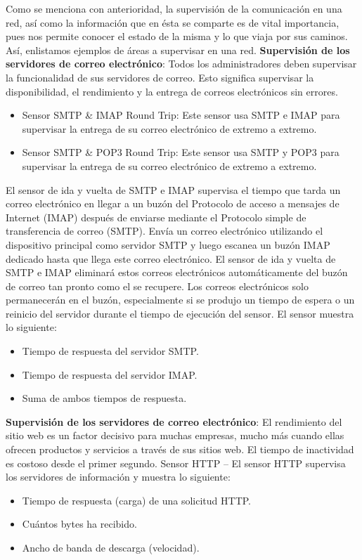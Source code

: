 \noindent
Como se menciona con anterioridad, la supervisión de la comunicación en una red, así como la información que en ésta se comparte es de vital importancia, pues nos permite conocer el estado de la misma y lo que viaja por sus caminos. 
Así, enlistamos ejemplos de áreas a supervisar en una red.
\newline
\newline
\textbf{Supervisión de los servidores de correo electrónico}: 
\newline
Todos los administradores deben supervisar la funcionalidad de sus servidores de correo. Esto significa supervisar la disponibilidad, el rendimiento y la entrega de correos electrónicos sin errores.
\begin{itemize}
	\item Sensor SMTP \& IMAP Round Trip: Este sensor usa SMTP e IMAP para supervisar la entrega de su correo electrónico de extremo a extremo.
	\item Sensor SMTP \& POP3 Round Trip: Este sensor usa SMTP y POP3 para supervisar la entrega de su correo electrónico de extremo a extremo.
\end{itemize}
\noindent
El sensor de ida y vuelta de SMTP e IMAP supervisa el tiempo que tarda un correo electrónico en llegar a un buzón del Protocolo de acceso a mensajes de Internet (IMAP) después de enviarse mediante el Protocolo simple de transferencia de correo (SMTP). Envía un correo electrónico utilizando el dispositivo principal como servidor SMTP y luego escanea un buzón IMAP dedicado hasta que llega este correo electrónico.
\newline
El sensor de ida y vuelta de SMTP e IMAP eliminará estos correos electrónicos automáticamente del buzón de correo tan pronto como el se recupere. Los correos electrónicos solo permanecerán en el buzón, especialmente si se produjo un tiempo de
espera o un reinicio del servidor durante el tiempo de ejecución del sensor.
El sensor muestra lo siguiente:
\begin{itemize}
	\item Tiempo de respuesta del servidor SMTP.
	\item Tiempo de respuesta del servidor IMAP.
	\item Suma de ambos tiempos de respuesta.
\end{itemize}

\noindent
\textbf{Supervisión de los servidores de correo electrónico}:
\newline
El rendimiento del sitio web es un factor decisivo para muchas empresas, mucho más cuando ellas ofrecen productos y servicios a través de sus sitios web. El tiempo de inactividad es costoso desde el primer segundo. 
\newline
Sensor HTTP – El sensor HTTP supervisa los servidores de información y muestra lo siguiente:
\begin{itemize}
	\item Tiempo de respuesta (carga) de una solicitud HTTP.
	\item Cuántos bytes ha recibido.
	\item Ancho de banda de descarga (velocidad).
\end{itemize}

